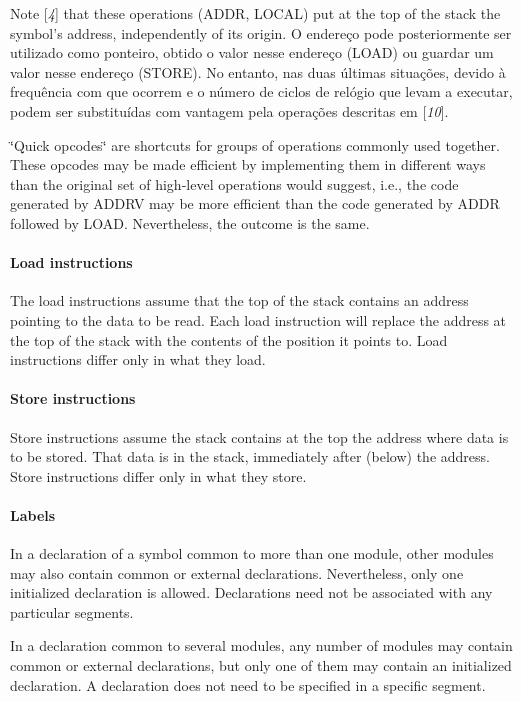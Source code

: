 Note [{\itshape 4}] that these operations (A\+D\+D\+R, L\+O\+C\+A\+L) put at the top of the stack the symbol's address, independently of its origin. O endereço pode posteriormente ser utilizado como ponteiro, obtido o valor nesse endereço (L\+O\+A\+D) ou guardar um valor nesse endereço (S\+T\+O\+R\+E). No entanto, nas duas últimas situações, devido à frequência com que ocorrem e o número de ciclos de relógio que levam a executar, podem ser substituídas com vantagem pela operações descritas em [{\itshape 10}].

\char`\"{}\+Quick opcodes\char`\"{} are shortcuts for groups of operations commonly used together. These opcodes may be made efficient by implementing them in different ways than the original set of high-\/level operations would suggest, i.\+e., the code generated by {\ttfamily A\+D\+D\+R\+V} may be more efficient than the code generated by {\ttfamily A\+D\+D\+R} followed by {\ttfamily L\+O\+A\+D}. Nevertheless, the outcome is the same.

\paragraph*{Load instructions}

The load instructions assume that the top of the stack contains an address pointing to the data to be read. Each load instruction will replace the address at the top of the stack with the contents of the position it points to. Load instructions differ only in what they load.

\paragraph*{Store instructions}

Store instructions assume the stack contains at the top the address where data is to be stored. That data is in the stack, immediately after (below) the address. Store instructions differ only in what they store.

\paragraph*{Labels}

In a declaration of a symbol common to more than one module, other modules may also contain common or external declarations. Nevertheless, only one initialized declaration is allowed. Declarations need not be associated with any particular segments.

In a declaration common to several modules, any number of modules may contain common or external declarations, but only one of them may contain an initialized declaration. A declaration does not need to be specified in a specific segment. 

